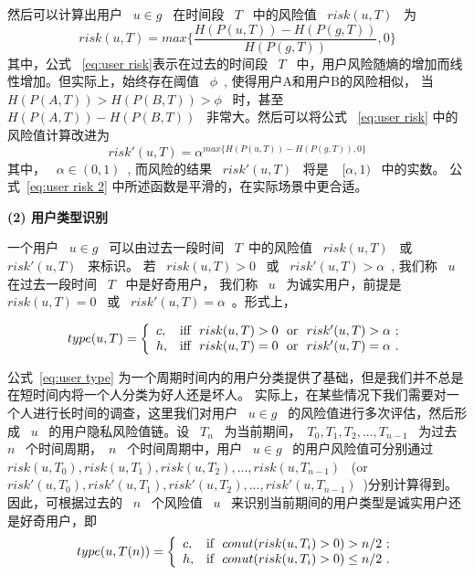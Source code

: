 然后可以计算出用户 ~$u \in g$~ 在时间段 ~$T$~ 中的风险值 ~$risk(u,T)$~ 为
\begin{equation}\label{eq:user risk}
risk(u,T)=max \{\frac{H(P(u,T))-H(P(g,T))}{H(P(g,T))},0\}
\end{equation}
其中，公式 ~\ref{eq:user risk}表示在过去的时间段 ~$T$~ 中，用户风险随熵的增加而线性增加。但实际上，始终存在阈值 ~$\phi$~, 使得用户A和用户B的风险相似， 当 ~$H(P(A,T))>H(P(B,T))>\phi$~ 时，甚至 ~$H(P(A,T))-H(P(B,T))$~ 非常大。然后可以将公式 ~\ref{eq:user risk} 中的风险值计算改进为
\begin{equation}\label{eq:user risk 2}
risk'(u,T)=\alpha ^ {max \{H(P(u,T))-H(P(g,T)),0\}}
\end{equation}
其中， ~$\alpha \in (0,1)$~, 而风险的结果 ~$risk'(u,T)$~ 将是 ~$~[\alpha, 1)$~ 中的实数。 公式~\ref{eq:user risk 2} 中所述函数是平滑的，在实际场景中更合适。

\textbf{(2) 用户类型识别}

一个用户 ~$u \in g$~ 可以由过去一段时间 ~$T$~中的风险值 ~$risk(u,T)$~ 或 ~$risk'(u,T)$~ 来标识。 若 ~$risk(u,T) > 0$~ 或 ~$risk'(u,T)>\alpha$~, 我们称 ~$u$~ 在过去一段时间 ~$T$~ 中是好奇用户， 我们称 ~$u$~ 为诚实用户，前提是  ~$risk(u,T) = 0$~ 或 ~$risk'(u,T)=\alpha$~。形式上，

\begin{equation}\label{eq:user type}
type(u,T)=
\left\{
\begin{array}{ll}
c, & \hbox{iff ~$risk(u,T) > 0$~ or ~$risk'(u,T)>\alpha$~;} \\
h, & \hbox{iff  ~$risk(u,T) = 0$~ or ~$risk'(u,T)=\alpha$~.} \\
\end{array}
\right.
\end{equation}

公式~\ref{eq:user type} 为一个周期时间内的用户分类提供了基础，但是我们并不总是在短时间内将一个人分类为好人还是坏人。 实际上，在某些情况下我们需要对一个人进行长时间的调查，这里我们对用户 ~$u \in g$~ 的风险值进行多次评估，然后形成 ~$u$~ 的用户隐私风险值链。设 ~$T_n$~ 为当前期间，~$T_0, T_1, T_2, ..., T_{n-1}$~ 为过去 ~$n$~ 个时间周期，~$n$~ 个时间周期中，用户 ~$u \in g$~ 的用户风险值可分别通过 ~$risk(u,T_0),risk(u,T_1),risk(u,T_2),..., risk(u,T_{n-1})$~ (or ~$risk'(u,T_0), risk'(u,T_1), risk'(u,T_2), ..., risk'(u,T_{n-1})$~)分别计算得到。因此，可根据过去的 ~$n$~ 个风险值 ~$u$~ 来识别当前期间的用户类型是诚实用户还是好奇用户，即
\begin{equation}\label{eq:user type Tn 1}
type(u,T(n))=
\left\{
\begin{array}{ll}
c, & \hbox{if ~$conut(risk(u,T_i) > 0) > n/2$~;} \\
h, & \hbox{if ~$conut(risk(u,T_i) > 0) \leq n/2$~.} \\
\end{array}
\right.
\end{equation}

